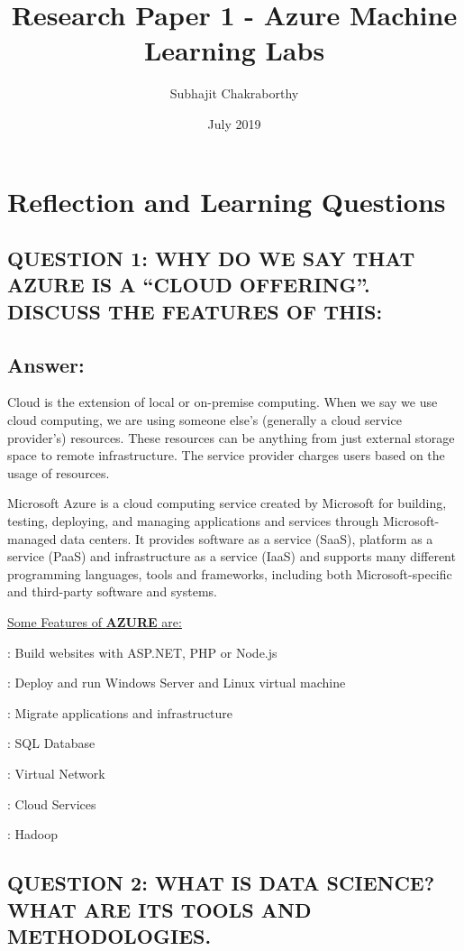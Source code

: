 \documentclass[10 pm]{article}
\title  {Research Paper 1 - Azure Machine Learning Labs }
\author{Subhajit Chakraborthy  }
\date{July 2019}
\begin{document}
\maketitle


\section{Reflection and Learning Questions}

\subsection{QUESTION 1: WHY DO WE SAY THAT AZURE IS A “CLOUD OFFERING”. DISCUSS THE FEATURES OF THIS:}

\subsection*{Answer:}
Cloud is the extension of local or on-premise computing. When we say we use cloud computing, we are using someone else’s (generally a cloud service provider’s) resources. These resources can be anything from just external storage space to remote infrastructure. The service provider charges users based on the usage of resources. 

Microsoft Azure is a cloud computing service created by Microsoft for building, testing, deploying, and managing applications and services through Microsoft-managed data centers. It provides software as a service (SaaS), platform as a service (PaaS) and infrastructure as a service (IaaS) and supports many different programming languages, tools and frameworks, including both Microsoft-specific and third-party software and systems. 

\underline{Some Features of \textbf{AZURE} are:} 

 : Build websites with ASP.NET, PHP or Node.js

 : Deploy and run Windows Server and Linux virtual machine

 : Migrate applications and infrastructure

 : SQL Database	

 : Virtual Network

 : Cloud Services

 : Hadoop


\subsection{QUESTION 2: WHAT IS DATA SCIENCE? WHAT ARE ITS TOOLS AND METHODOLOGIES.}
\end{document}
